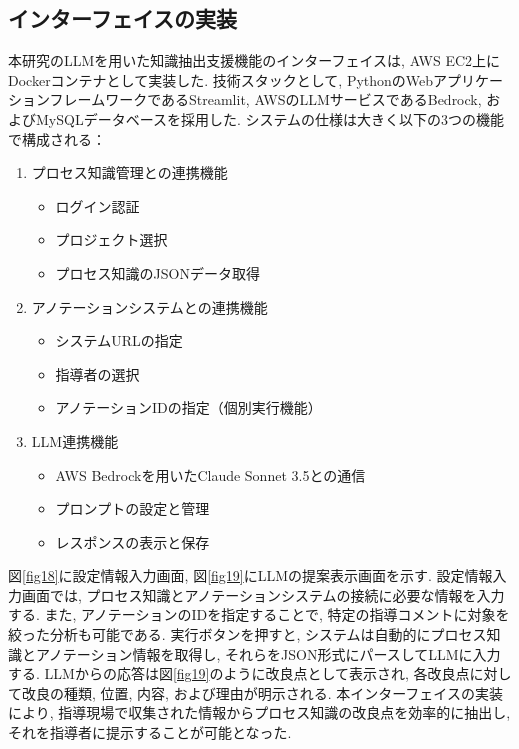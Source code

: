 \label{fig17}



\subsection{インターフェイスの実装}
本研究のLLMを用いた知識抽出支援機能のインターフェイスは, AWS EC2上にDockerコンテナとして実装した. 技術スタックとして, PythonのWebアプリケーションフレームワークであるStreamlit, AWSのLLMサービスであるBedrock, およびMySQLデータベースを採用した. 
システムの仕様は大きく以下の3つの機能で構成される：
\begin{enumerate}
\item プロセス知識管理との連携機能
\begin{itemize}
\item ログイン認証
\item プロジェクト選択
\item プロセス知識のJSONデータ取得
\end{itemize}
\item アノテーションシステムとの連携機能
    \begin{itemize}
        \item システムURLの指定
        \item 指導者の選択
        \item アノテーションIDの指定（個別実行機能）
    \end{itemize}
\item LLM連携機能
    \begin{itemize}
        \item AWS Bedrockを用いたClaude Sonnet 3.5との通信
        \item プロンプトの設定と管理
        \item レスポンスの表示と保存
    \end{itemize}
\end{enumerate}
図\ref{fig18}に設定情報入力画面, 図\ref{fig19}にLLMの提案表示画面を示す. 設定情報入力画面では, プロセス知識とアノテーションシステムの接続に必要な情報を入力する. また, アノテーションのIDを指定することで, 特定の指導コメントに対象を絞った分析も可能である. 実行ボタンを押すと, システムは自動的にプロセス知識とアノテーション情報を取得し, それらをJSON形式にパースしてLLMに入力する. LLMからの応答は図\ref{fig19}のように改良点として表示され, 各改良点に対して改良の種類, 位置, 内容, および理由が明示される. 
本インターフェイスの実装により, 指導現場で収集された情報からプロセス知識の改良点を効率的に抽出し, それを指導者に提示することが可能となった. 

